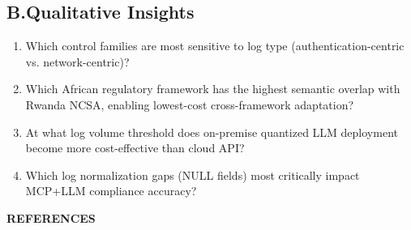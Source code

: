\documentclass[12pt]{article}
\begin{document}
\subsection*{B.\quad Qualitative Insights}

\begin{enumerate}
    \item Which control families are most sensitive to log type (authentication-centric vs. network-centric)?
    \item Which African regulatory framework has the highest semantic overlap with Rwanda NCSA, enabling lowest-cost cross-framework adaptation?
    \item At what log volume threshold does on-premise quantized LLM deployment become more cost-effective than cloud API?
    \item Which log normalization gaps (NULL fields) most critically impact MCP+LLM compliance accuracy?
\end{enumerate}

\bigskip

\textbf{REFERENCES}
\end{document}
